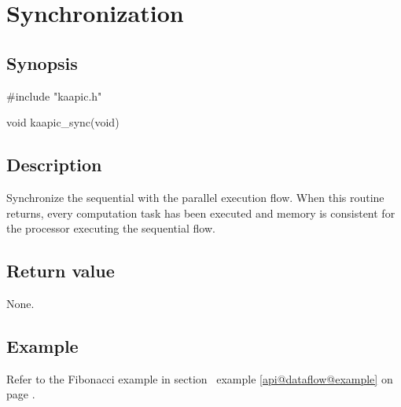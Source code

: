 \documentclass[a4paper, 11pt]{article}
\makeatletter
\newcommand{\apirefp}[2][\@empty]{%
  \def\api@part{#1}%
  \def\api@partref{\@empty}%
  \ifx\api@part\api@partref%
    \def\api@lab{api@#2}%
  \else%
    \def\api@lab{api@#2@#1}%
  \fi%
  \expandafter\ref\expandafter{\api@lab} on page \pageref{\api@lab}%
}
\newenvironment{apisection}[2][noshortnameprovided]{%
  \newpage
  \section{#2}
  \label{api@#1}
  \newcommand{\api@newpart}[4][noshortpartnameprovided]{%
    \newenvironment{##1}{%
      \subsection{##2}%
      \label{api@#1@##1}%
      ##3%
    }{##4}%
  }%
  \api@newpart[synopsis]{Synopsis}{}{}%
  \api@newpart[call]{Call}{}{}%
  \api@newpart[desc]{Description}{}{}%
  \api@newpart[params]{Parameters}{%
    \let\api@indesc\@empty
    \newcommand{\param}[1]{%
      \def\api@indesc{yes}%
      \begin{description}%
        \renewcommand{\param}[1]{\item[########1]}%
      \item[####1]
      }%
      \newenvironment{parameters}{%
        \begin{description}%
          \renewcommand{\param}[1]{\item[########1]}%
        }{%
        \end{description}%
      }
    }{%
      \ifx\api@indesc\@empty\relax\else%
    \end{description}%
    \fi%
  }%
  \api@newpart[ret]{Return value}{%
    \newcommand{\otherret}{\par\medskip\noindent}%
  }{}%
  \api@newpart[example]{Example}{}{}%
}{}
\makeatother
\begin{document}
\begin{apisection}[sync]{Synchronization}

  \begin{synopsis}
    \begin{code}
#include "kaapic.h"

void kaapic_sync(void)
    \end{code}
  \end{synopsis}

  \begin{desc}
    Synchronize the sequential with the parallel execution flow. When
    this routine returns, every computation task has been executed and
    memory is consistent for the processor executing the sequential
    flow.
  \end{desc}
  \begin{ret}
    None.
  \end{ret}
  \begin{example}
    Refer to the Fibonacci example in section~\apirefp[example]{dataflow}.
  \end{example}
\end{apisection}
\end{document}
